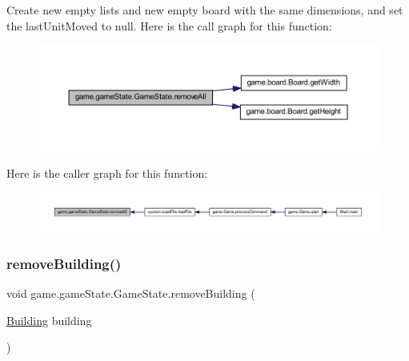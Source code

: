 Create new empty lists and new empty board with the same dimensions, and set the last\+Unit\+Moved to null. Here is the call graph for this function\+:
\nopagebreak
\begin{figure}[H]
\begin{center}
\leavevmode
\includegraphics[width=350pt]{classgame_1_1game_state_1_1_game_state_ac216deada73327e534501b741a7ffa54_cgraph}
\end{center}
\end{figure}
Here is the caller graph for this function\+:
\nopagebreak
\begin{figure}[H]
\begin{center}
\leavevmode
\includegraphics[width=350pt]{classgame_1_1game_state_1_1_game_state_ac216deada73327e534501b741a7ffa54_icgraph}
\end{center}
\end{figure}
\mbox{\label{classgame_1_1game_state_1_1_game_state_ac1a1d226c2aee2ff606c94ec1f2d2243}} 
\subsubsection{\texorpdfstring{remove\+Building()}{removeBuilding()}}
{\footnotesize\ttfamily void game.\+game\+State.\+Game\+State.\+remove\+Building (\begin{DoxyParamCaption}\item[{\mbox{\hyperlink{classgame_1_1board_1_1_building}{Building}}}]{building }\end{DoxyParamCaption})\hspace{0.3cm}{\ttfamily [inline]}}

